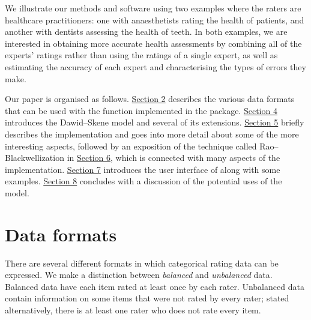 We illustrate our methods and software using two examples where the raters are
healthcare practitioners: one with anaesthetists rating the health of patients,
and another with dentists assessing the health of teeth. In both examples, we
are interested in obtaining more accurate health assessments by combining all
of the experts' ratings rather than using the ratings of a single expert,
as well as estimating the accuracy of each expert and characterising the types
of errors they make.

Our paper is organised as follows. \protect\hyperlink{sec:data-formats}{Section 2} describes the
various data formats that can be used with the function implemented in
the package. \protect\hyperlink{sec:models}{Section 4} introduces the Dawid--Skene model and
several of its extensions. \protect\hyperlink{sec:implementation}{Section 5} briefly describes
the implementation and goes into more detail about some of the more
interesting aspects, followed by an exposition of the technique called
Rao--Blackwellization in \protect\hyperlink{sec:rao-blackwellization}{Section 6}, which is
connected with many aspects of the implementation. \protect\hyperlink{sec:usage}{Section 7}
introduces the user interface of  along with some
examples. \protect\hyperlink{sec:summary}{Section 8} concludes with a discussion of the potential
uses of the model.

\hypertarget{sec:data-formats}{%
\section{Data formats}\label{sec:data-formats}}

There are several different formats in which categorical rating data can
be expressed. We make a distinction between \emph{balanced} and \emph{unbalanced}
data. Balanced data have each item rated at least once by each rater.
Unbalanced data contain information on some items that were not rated by
every rater; stated alternatively, there is at least one rater who does
not rate every item.

